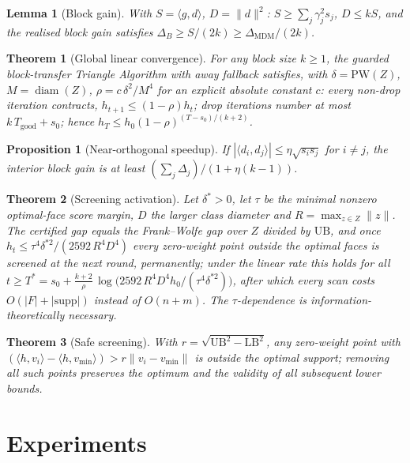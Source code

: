 \documentclass[11pt]{article}
\newtheorem{theorem}{Theorem}
\newtheorem{lemma}{Lemma}
\newtheorem{proposition}{Proposition}
\theoremstyle{remark}
\newcommand{\PW}{\mathrm{PW}}
\newcommand{\ip}[2]{\langle #1, #2 \rangle}
\newcommand{\norm}[1]{\lVert #1 \rVert}
\begin{document}
\begin{lemma}[Block gain]
With $S=\ip{g}{d}$, $D=\norm{d}^2$: $S\ge\sum_j\gamma_j^2 s_j$,
$D\le kS$, and the realised block gain satisfies
$\Delta_B\ge S/(2k)\ge\Delta_{\mathrm{MDM}}/(2k)$.
\end{lemma}

\begin{theorem}[Global linear convergence]
For any block size $k\ge1$, the guarded block-transfer Triangle Algorithm
with away fallback satisfies, with $\delta=\PW(Z)$, $M=\operatorname{diam}(Z)$,
$\rho=c\,\delta^2/M^4$ for an explicit absolute constant $c$:
every non-drop iteration contracts, $h_{t+1}\le(1-\rho)h_t$; drop
iterations number at most $k\,T_{\mathrm{good}}+s_0$; hence
$h_T\le h_0(1-\rho)^{(T-s_0)/(k+2)}$.
\end{theorem}

\begin{proposition}[Near-orthogonal speedup]
If $|\ip{d_i}{d_j}|\le\eta\sqrt{s_i s_j}$ for $i\ne j$, the interior
block gain is at least $(\sum_j\Delta_j)/(1+\eta(k-1))$.
\end{proposition}

\begin{theorem}[Screening activation]
Let $\delta^*>0$, let $\tau$ be the minimal nonzero optimal-face score
margin, $D$ the larger class diameter and $R=\max_{z\in Z}\norm{z}$. The
certified gap equals the Frank--Wolfe gap over $Z$ divided by
$\mathrm{UB}$, and once
$h_t \le \tau^4\delta^{*2}/(2592\,R^4 D^4)$
every zero-weight point outside the optimal faces is screened at the
next round, permanently; under the linear rate this holds for all
$t \ge T^* = s_0 + \tfrac{k+2}{\rho}\,
\log\!\bigl(2592\,R^4D^4 h_0/(\tau^4\delta^{*2})\bigr)$,
after which every scan costs $O(|F|+|\mathrm{supp}|)$ instead of
$O(n+m)$. The $\tau$-dependence is information-theoretically necessary.
\end{theorem}

\begin{theorem}[Safe screening]
With $r=\sqrt{\mathrm{UB}^2-\mathrm{LB}^2}$, any zero-weight point with
$(\ip{h}{v_i}-\ip{h}{v_{\min}})>r\norm{v_i-v_{\min}}$ is outside the
optimal support; removing all such points preserves the optimum and the
validity of all subsequent lower bounds.
\end{theorem}

\section{Experiments}
\end{document}
